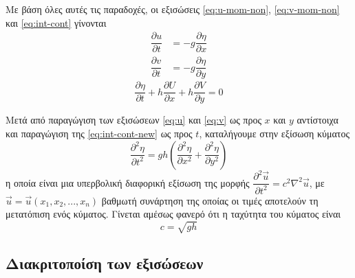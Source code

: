 Με βάση όλες αυτές τις παραδοχές, οι εξισώσεις \ref{eq:u-mom-non}, \ref{eq:v-mom-non} και \ref{eq:int-cont} γίνονται
\begin{align}
    \dfrac{\partial{u}}{\partial{t}} &= -g\dfrac{\partial{η}}{\partial{x}} \label{eq:u} \\
    \dfrac{\partial{v}}{\partial{t}} &= -g\dfrac{\partial{η}}{\partial{y}} \label{eq:v}
\end{align}
\begin{equation}
    \dfrac{\partial{η}}{\partial{t}} + h\dfrac{\partial{U}}{\partial{x}} + h\dfrac{\partial{V}}{\partial{y}} = 0 \label{eq:int-cont-new}
\end{equation}

Μετά από παραγώγιση των εξισώσεων \ref{eq:u} και \ref{eq:v} ως προς $x$ και $y$ αντίστοιχα και παραγώγιση της \ref{eq:int-cont-new} ως προς $t$, καταλήγουμε στην εξίσωση κύματος
\begin{equation}
    \dfrac{\partial^2{η}}{\partial{t}^2} = gh\left( \dfrac{\partial^2{η}}{\partial{x}^2} + \dfrac{\partial^2{η}}{\partial{y}^2} \right) \label{eq:wave}
\end{equation}
η οποία είναι μια υπερβολική διαφορική εξίσωση της μορφής $\dfrac{\partial^2{\vec{u}}}{\partial{t}^2}=c^2 \nabla^2 \vec{u}$, με $\vec{u} = \vec{u}(x_1, x_2, ... , x_n)$ βαθμωτή συνάρτηση της οποίας οι τιμές αποτελούν τη μετατόπιση ενός κύματος. Γίνεται αμέσως φανερό ότι η ταχύτητα του κύματος είναι 
\begin{equation}
    c=\sqrt{gh} \label{eq:celerity}
\end{equation}

\subsection{Διακριτοποίση των εξισώσεων}